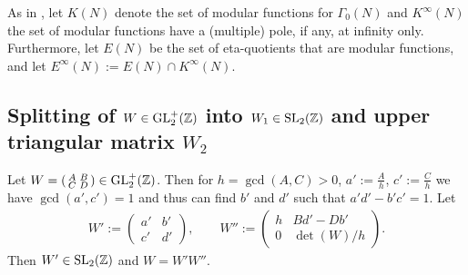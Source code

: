 \documentclass{article}
\begin{document}
As in \cite{Radu_RamanujanKolberg_2015}, let $K(N)$ denote the set of
modular functions for $\Gamma_0(N)$ and $K^\infty(N)$ the set of
modular functions have a (multiple) pole, if any, at infinity only.
Furthermore, let $E(N)$ be the set of eta-quotients that are
modular functions, and let $E^\infty(N) := E(N)\cap K^\infty(N)$.



\subsection{Splitting of $W \in \mathrm{GL}_2^+(\mathbb{Z})$ into
  $W_1\in \SL2Z$ and upper triangular matrix $W_2$}

\begin{Lemma}
  \label{thm:W-splitting}
  Let
  $W=\left(\begin{smallmatrix}A&B\\C&D\end{smallmatrix}\right) \in
  \mathrm{GL}_2^+(\mathbb{Z})$.
  Then for $h=\gcd(A, C)>0$, $a':=\frac{A}{h}$, $c':=\frac{C}{h}$ we
  have $\gcd(a', c')=1$ and thus can find $b'$ and $d'$ such that
  $a'd'-b'c'=1$.
  Let
  \begin{gather*}
    W':=\begin{pmatrix}a'&b'\\c'&d'\end{pmatrix},
    \qquad
    W''
    :=
    \begin{pmatrix}
      h &B d'-D b'\\
      0 & \det(W) / h
    \end{pmatrix}.
  \end{gather*}
  Then $W'\in \SL2Z$ and $W = W' W''$.
\end{Lemma}
\end{document}
